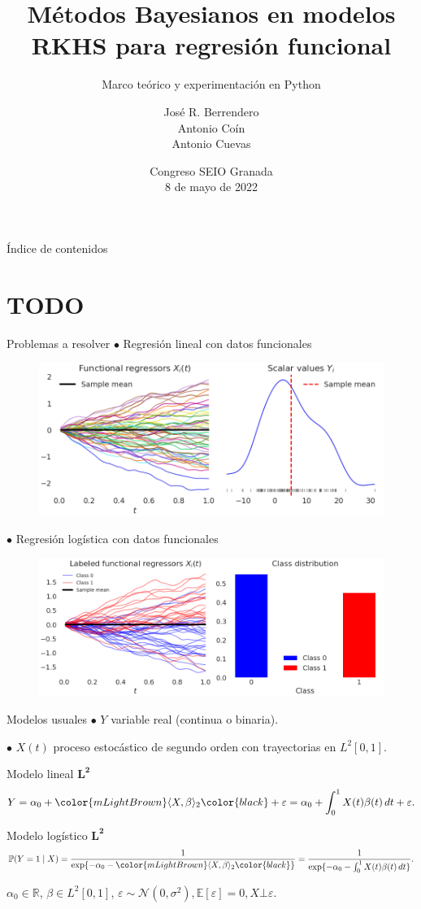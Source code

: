 \documentclass[10pt, spanish, professionalfonts]{beamer}
\title{Métodos Bayesianos en modelos RKHS para regresión funcional}
\subtitle{Marco teórico y experimentación en Python}
\date{Congreso SEIO Granada\\ 8 de mayo de 2022\\}
\author{José R. Berrendero \\ Antonio Coín  \\ Antonio Cuevas\\}
\institute{Universidad Autónoma de Madrid \\ \textit{Departamento de Matemáticas}}
\newcommand\maroon[1]{\color{mLightBrown}#1\color{black}}
\begin{document}
\maketitle

\begin{frame}{Índice de contenidos}
  \tableofcontents
\end{frame}

\section{TODO}

\begin{frame}{Problemas a resolver}
  \(\bullet\) Regresión \maroon{lineal} con datos funcionales

\begin{figure}
    \includegraphics[width=.65\textwidth]{img/data_lin}
  \end{figure}

\(\bullet\) Regresión \maroon{logística} con datos funcionales

\begin{figure}
    \includegraphics[width=.65\textwidth]{img/data_log}
  \end{figure}
\end{frame}

\begin{frame}{Modelos usuales}
  \(\bullet\) \(Y\) variable real (continua o binaria).

  \(\bullet\) \(X(t)\) proceso estocástico de segundo orden con trayectorias en \(L^2[0, 1]\).

  \vspace{1em}

\begin{block}{Modelo lineal \(\bm{L^2}\)}
  \[
    Y = \alpha_0 + \maroon{\langle X, \beta \rangle_2} + \varepsilon = \alpha_0 + \int_0^1 X(t)\beta(t)\, dt + \varepsilon.
  \]
\end{block}
\begin{block}{Modelo logístico \(\bm{L^2}\)}
    \[
    \mathbb P (Y=1\mid X) = \frac{1}{\exp\{-\alpha_0 - \maroon{\langle X, \beta\rangle_2}\}} = \frac{1}{\exp\{-\alpha_0 - \int_0^1 X(t)\beta(t)\, dt\}}.
  \]
\end{block}
  \(\alpha_0\in\mathbb R\), \(\beta \in L^2[0, 1]\), \(\varepsilon \sim \mathcal N(0, \sigma^2), \mathbb E[\varepsilon]=0, X \bot \varepsilon\).
\end{frame}
\end{document}

